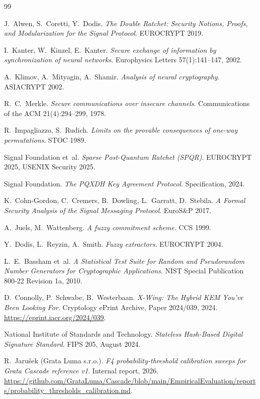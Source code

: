 \documentclass[11pt,a4paper]{article}
\begin{document}
\begin{thebibliography}{99}

 J.~Alwen, S.~Coretti, Y.~Dodis. \emph{The Double Ratchet: Security Notions, Proofs, and Modularization for the Signal Protocol}. EUROCRYPT 2019.

 I.~Kanter, W.~Kinzel, E.~Kanter. \emph{Secure exchange of information by synchronization of neural networks}. Europhysics Letters 57(1):141--147, 2002.

 A.~Klimov, A.~Mityagin, A.~Shamir. \emph{Analysis of neural cryptography}. ASIACRYPT 2002.

 R.~C.~Merkle. \emph{Secure communications over insecure channels}. Communications of the ACM 21(4):294--299, 1978.

 R.~Impagliazzo, S.~Rudich. \emph{Limits on the provable consequences of one-way permutations}. STOC 1989.

 Signal Foundation et~al. \emph{Sparse Post-Quantum Ratchet (SPQR)}. EUROCRYPT 2025, USENIX Security 2025.

 Signal Foundation. \emph{The PQXDH Key Agreement Protocol}. Specification, 2024.

 K.~Cohn-Gordon, C.~Cremers, B.~Dowling, L.~Garratt, D.~Stebila. \emph{A Formal Security Analysis of the Signal Messaging Protocol}. EuroS\&P 2017.

 A.~Juels, M.~Wattenberg. \emph{A fuzzy commitment scheme}. CCS 1999.

 Y.~Dodis, L.~Reyzin, A.~Smith. \emph{Fuzzy extractors}. EUROCRYPT 2004.

 L.~E.~Bassham et~al. \emph{A Statistical Test Suite for Random and Pseudorandom Number Generators for Cryptographic Applications}. NIST Special Publication 800-22 Revision 1a, 2010.

 D.~Connolly, P.~Schwabe, B.~Westerbaan. \emph{X-Wing: The Hybrid KEM You've Been Looking For}. Cryptology ePrint Archive, Paper 2024/039, 2024. \url{https://eprint.iacr.org/2024/039}.

 National Institute of Standards and Technology. \emph{Stateless Hash-Based Digital Signature Standard}. FIPS 205, August 2024.

 R.~Jaru\v{s}ek (Grata Luma s.r.o.). \emph{F4 probability-threshold calibration sweeps for Grata Cascade reference v1}. Internal report, 2026. \url{https://github.com/GrataLuma/Cascade/blob/main/EmpiricalEvaluation/reports/probability_thresholds_calibration.md}.

\end{thebibliography}
\end{document}
